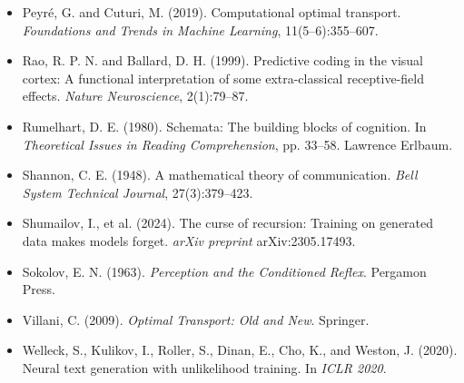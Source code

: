 \begin{itemize}
\item Peyré, G. and Cuturi, M. (2019). Computational optimal transport. \textit{Foundations and Trends in Machine Learning}, 11(5--6):355--607.
\end{itemize}

\begin{itemize}
\item Rao, R. P. N. and Ballard, D. H. (1999). Predictive coding in the visual cortex: A functional interpretation of some extra-classical receptive-field effects. \textit{Nature Neuroscience}, 2(1):79--87.
\end{itemize}

\begin{itemize}
\item Rumelhart, D. E. (1980). Schemata: The building blocks of cognition. In \textit{Theoretical Issues in Reading Comprehension}, pp. 33--58. Lawrence Erlbaum.
\end{itemize}

\begin{itemize}
\item Shannon, C. E. (1948). A mathematical theory of communication. \textit{Bell System Technical Journal}, 27(3):379--423.
\end{itemize}

\begin{itemize}
\item Shumailov, I., et al. (2024). The curse of recursion: Training on generated data makes models forget. \textit{arXiv preprint} arXiv:2305.17493.
\end{itemize}

\begin{itemize}
\item Sokolov, E. N. (1963). \textit{Perception and the Conditioned Reflex}. Pergamon Press.
\end{itemize}

\begin{itemize}
\item Villani, C. (2009). \textit{Optimal Transport: Old and New}. Springer.
\end{itemize}

\begin{itemize}
\item Welleck, S., Kulikov, I., Roller, S., Dinan, E., Cho, K., and Weston, J. (2020). Neural text generation with unlikelihood training. In \textit{ICLR 2020}.
\end{itemize}

